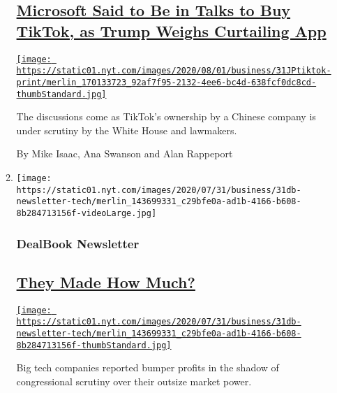 \begin{enumerate}
\begin{enumerate}
    \hypertarget{microsoft-said-to-be-in-talks-to-buy-tiktok-as-trump-weighs-curtailing-app}{%
    \subsection{\texorpdfstring{\href{/2020/07/31/technology/tiktok-microsoft.html}{Microsoft
    Said to Be in Talks to Buy TikTok, as Trump Weighs Curtailing
    App}}{Microsoft Said to Be in Talks to Buy TikTok, as Trump Weighs Curtailing App}}\label{microsoft-said-to-be-in-talks-to-buy-tiktok-as-trump-weighs-curtailing-app}}

    \href{/2020/07/31/technology/tiktok-microsoft.html}{\texttt{[image: https://static01.nyt.com/images/2020/08/01/business/31JPtiktok-print/merlin\_170133723\_92af7f95-2132-4ee6-bc4d-638fcf0dc8cd-thumbStandard.jpg]}}

    The discussions come as TikTok's ownership by a Chinese company is
    under scrutiny by the White House and lawmakers.

    By Mike Isaac, Ana Swanson and Alan Rappeport
  \item
    \texttt{[image: https://static01.nyt.com/images/2020/07/31/business/31db-newsletter-tech/merlin\_143699331\_c29bfe0a-ad1b-4166-b608-8b284713156f-videoLarge.jpg]}

    \hypertarget{dealbook-newsletter}{%
    \subsubsection{DealBook Newsletter}\label{dealbook-newsletter}}

    \hypertarget{they-made-how-much}{%
    \subsection{\texorpdfstring{\href{/2020/07/31/business/dealbook/tech-earnings-economy.html}{They
    Made How Much?}}{They Made How Much?}}\label{they-made-how-much}}

    \href{/2020/07/31/business/dealbook/tech-earnings-economy.html}{\texttt{[image: https://static01.nyt.com/images/2020/07/31/business/31db-newsletter-tech/merlin\_143699331\_c29bfe0a-ad1b-4166-b608-8b284713156f-thumbStandard.jpg]}}

    Big tech companies reported bumper profits in the shadow of
    congressional scrutiny over their outsize market power.
  \end{enumerate}
\end{enumerate}

